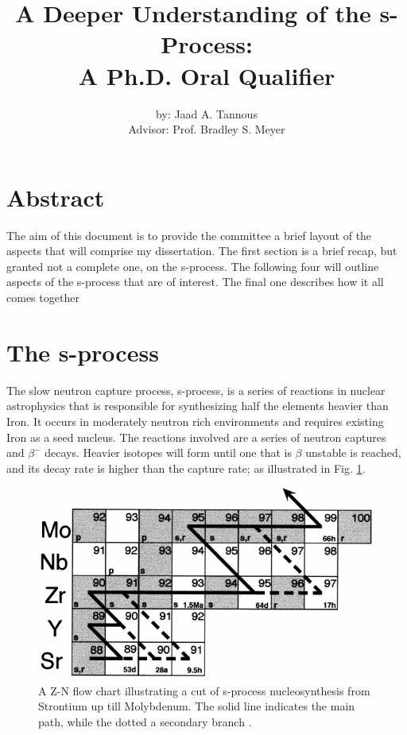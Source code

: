 \documentclass{article}
\title{A Deeper Understanding of the s-Process:\\
A Ph.D. Oral Qualifier}
\author{by: Jaad A. Tannous\\
Advisor: Prof. Bradley S. Meyer}
\date{}
\begin{document}
\maketitle

\section*{Abstract}
The aim of this document is to provide the committee a brief layout of the aspects that will comprise my dissertation. The first 
section is a brief recap, but granted not a complete one, on the s-process. The following four will outline aspects of the s-process 
that are of interest. The final one describes how it all comes together

\section*{The s-process}
The slow neutron capture process, s-process, is a series of reactions in nuclear astrophysics that is responsible 
for synthesizing half the elements heavier than Iron. It occurs in moderately neutron rich environments and requires 
existing Iron as a seed nucleus. The reactions involved are a series of neutron captures and $\beta^{-}$ decays. Heavier 
isotopes will form until one that is $\beta$ unstable is reached, and its decay rate is higher than the capture rate; as illustrated 
in Fig. \ref{fig 1}.

\begin{figure}[!htp]
    \centerline{\includegraphics[scale = 0.5]{images/sprocess.png}}
    \caption{A Z-N flow chart illustrating a cut of s-process nucleosynthesis from Strontium up till 
    Molybdenum. The solid line indicates the main path, while the dotted a secondary branch \cite{nic98}.}
    \label{fig 1}
\end{figure}
\end{document}
